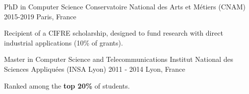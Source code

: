 
\begin{cventries}

  \cventry
  {PhD in Computer Science}
  {Conservatoire National des Arts et Métiers (CNAM)} %
  {2015-2019} %
  {Paris, France} %
    {
      \begin{cvitems} %
      \item{Recipient of a CIFRE scholarship, designed to fund research with direct industrial applications (10\% of grants).}
      \end{cvitems}
    }

  \cventry
    {Master in Computer Science and Telecommunications} %
    {Institut National des Sciences Appliquées (INSA Lyon)} %
    {2011 - 2014} %
    {Lyon, France} %
    {
      \begin{cvitems} %
      \item {Ranked among the \textbf{top 20\%} of students.}
      \end{cvitems}
    }

\end{cventries}
